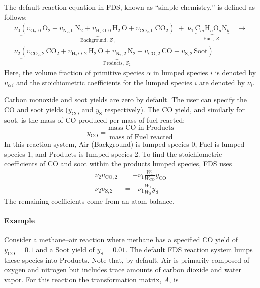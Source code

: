 The default reaction equation in FDS, known as ``simple chemistry,'' is defined as follows:
\begin{multline}\label{eq:full_lump}
\nu_{0}\underbrace{(\upsilon_{\mathrm{O}_{2},0} \, \mathrm{O}_2 +\upsilon_{\mathrm{N}_{2},0} \, \mathrm{N}_2 + \upsilon_{\mathrm{H}_{2} \, \mathrm{O},0} \, \mathrm{H}_2 \, \mathrm{O}+\upsilon_{\mathrm{CO}_{2},0} \, \mathrm{CO}_2)}_\text{Background,~$Z_0$} \; + \; \nu_{1} \, \underbrace{\mbox{C}_m\mbox{H}_n\mbox{O}_a\mbox{N}_b}_\text{Fuel,~$Z_1$} \quad \longrightarrow \\
\nu_{2}\underbrace{(\upsilon_{\mathrm{CO}_{2},2} \, \mathrm{CO}_2 + \upsilon_{\mathrm{H}_{2} \, \mathrm{O},2} \, \mathrm{H}_2 \, \mathrm{O} + \upsilon_{\mathrm{N}_{2},2} \, \mathrm{N}_2+\upsilon_{\mathrm{CO},2} \, \mathrm{CO} + \upsilon_{\mathrm{S},2} \, \mathrm{Soot})}_\text{Products,~$Z_2$}
\end{multline}
Here, the volume fraction of primitive species $\alpha$ in lumped species $i$ is denoted by $\upsilon_{\alpha\,i}$ and the stoichiometric coefficients for the lumped species $i$ are denoted by $\nu_{i}$.

Carbon monoxide and soot yields are zero by default. The user can specify the CO and soot yields ($y_{\mathrm{CO}}$ and $y_{\mathrm{S}}$ respectively). The CO yield, and similarly for soot, is the mass of CO produced per mass of fuel reacted:
\begin{equation}\label{eq:y_co}
y_\mathrm{CO} = \frac{\mbox{mass CO in Products}}{\mbox{mass of Fuel reacted}}
\end{equation}
In this reaction system, Air (Background) is lumped species 0, Fuel is lumped species 1, and Products is lumped species 2. To find the stoichiometric coefficients of CO and soot within the products lumped species, FDS uses
\begin{align}\label{eq:yields}
\nu_{2}\upsilon_{\mathrm{CO},2}&=-\nu_{1}\frac{W_1}{W_{\mathrm{CO}}}y_{\mathrm{CO}} \\
\nu_{2}\upsilon_{\mathrm{S},2}&=-\nu_{1}\frac{W_1}{W_{\mathrm{S}}}y_{\mathrm{S}}
\end{align}
The remaining coefficients come from an atom balance.

\paragraph{Example} Consider a methane--air reaction where methane has a specified CO yield of $y_{\mathrm{CO}}=0.1$ and a Soot yield of $y_{\mathrm{S}}=0.01$. The default FDS reaction system lumps these species into Products. Note that, by default, Air is primarily composed of oxygen and nitrogen but includes trace amounts of carbon dioxide and water vapor. For this reaction the transformation matrix, $A$, is

